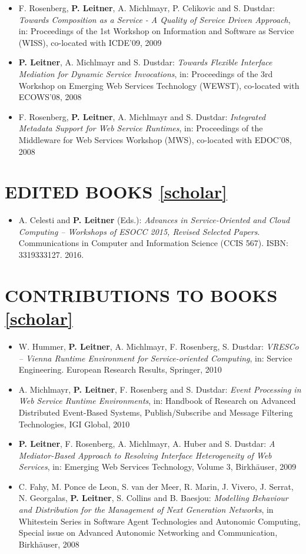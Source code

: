 \documentclass[paper=letter,fontsize=11pt]{scrartcl} %
\newcommand{\NewPart}[2]{\section*{\uppercase{#1} #2}}
\begin{document}
\begin{itemize}
\item F. Rosenberg, \textbf{P. Leitner}, A. Michlmayr, P. Celikovic and S. Dustdar: \emph{Towards Composition as a Service - A Quality of Service Driven Approach}, in: Proceedings of the 1st Workshop on Information and Software as Service (WISS), co-located with ICDE'09, 2009
\item \textbf{P. Leitner}, A. Michlmayr and S. Dustdar: \emph{Towards Flexible Interface Mediation for Dynamic Service Invocations}, in: Proceedings of the 3rd Workshop on Emerging Web Services Technology (WEWST), co-located with ECOWS'08, 2008
\item F. Rosenberg, \textbf{P. Leitner}, A. Michlmayr and S. Dustdar: \emph{Integrated Metadata Support for Web Service Runtimes}, in: Proceedings of the Middleware for Web Services Workshop (MWS), co-located with EDOC'08, 2008
\end{itemize}

\NewPart{Edited Books}{\href{https://scholar.google.ch/citations?user=wZ9f8CAAAAAJ}{[scholar]}}

\begin{itemize}
	\item A. Celesti and \textbf{P. Leitner} (Eds.): \emph{Advances in
  Service-Oriented and Cloud Computing -- Workshops of ESOCC 2015, Revised Selected Papers}.
Communications in Computer and Information Science (CCIS 567). ISBN: 3319333127. 2016.

\end{itemize}

\NewPart{Contributions to Books}{\href{https://scholar.google.ch/citations?user=wZ9f8CAAAAAJ}{[scholar]}}

\begin{itemize}
\item W. Hummer, \textbf{P. Leitner}, A. Michlmayr, F. Rosenberg, S. Dustdar:
\emph{VRESCo -- Vienna Runtime Environment for Service-oriented Computing},
in: Service Engineering. European Research Results, Springer, 2010
\item A. Michlmayr, \textbf{P. Leitner}, F. Rosenberg and S. Dustdar: \emph{Event
Processing in Web Service Runtime Environments}, in: Handbook of
Research on Advanced Distributed Event-Based Systems, Publish/Subscribe and
Message Filtering Technologies, IGI Global, 2010
\item \textbf{P. Leitner}, F. Rosenberg, A. Michlmayr, A. Huber and S. Dustdar:
\emph{A Mediator-Based Approach to Resolving Interface Heterogeneity of Web
Services}, in: Emerging Web Services Technology, Volume 3,
Birkh\"auser, 2009
\item C. Fahy, M. Ponce de Leon, S. van der Meer, R. Marin, J. Vivero, J. Serrat,
N. Georgalas, \textbf{P. Leitner}, S. Collins and B. Baesjou: \emph{Modelling
Behaviour and Distribution for the Management of Next Generation Networks},
in Whitestein Series in Software Agent Technologies and Autonomic
Computing, Special issue on Advanced Autonomic Networking and Communication,
Birkh\"auser, 2008
\end{itemize}
\end{document}
